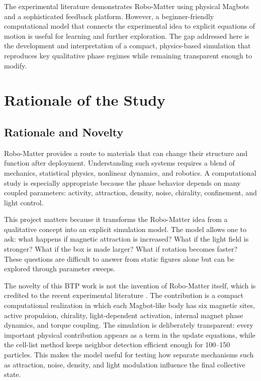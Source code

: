 \documentclass[12pt,a4paper,oneside]{report}
\begin{document}
The experimental literature demonstrates Robo-Matter using physical Magbots and a sophisticated feedback platform. However, a beginner-friendly computational model that connects the experimental idea to explicit equations of motion is useful for learning and further exploration. The gap addressed here is the development and interpretation of a compact, physics-based simulation that reproduces key qualitative phase regimes while remaining transparent enough to modify.

\chapter{Rationale of the Study}

\section{Rationale and Novelty}
Robo-Matter provides a route to materials that can change their structure and function after deployment. Understanding such systems requires a blend of mechanics, statistical physics, nonlinear dynamics, and robotics. A computational study is especially appropriate because the phase behavior depends on many coupled parameters: activity, attraction, density, noise, chirality, confinement, and light control.

This project matters because it transforms the Robo-Matter idea from a qualitative concept into an explicit simulation model. The model allows one to ask: what happens if magnetic attraction is increased? What if the light field is stronger? What if the box is made larger? What if rotation becomes faster? These questions are difficult to answer from static figures alone but can be explored through parameter sweeps.

The novelty of this BTP work is not the invention of Robo-Matter itself, which is credited to the recent experimental literature \cite{wang2024robomatter}. The contribution is a compact computational realization in which each Magbot-like body has six magnetic sites, active propulsion, chirality, light-dependent activation, internal magnet phase dynamics, and torque coupling. The simulation is deliberately transparent: every important physical contribution appears as a term in the update equations, while the cell-list method keeps neighbor detection efficient enough for 100--150 particles. This makes the model useful for testing how separate mechanisms such as attraction, noise, density, and light modulation influence the final collective state.
\end{document}
